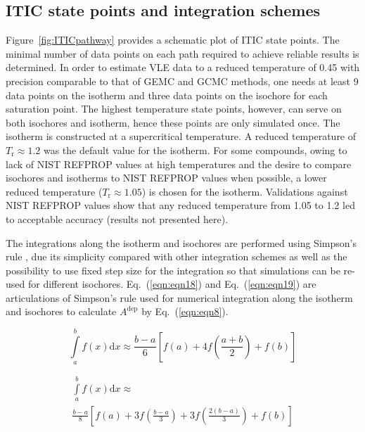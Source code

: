 \documentclass[5p,times]{elsarticle}
\begin{document}
\subsection{ITIC state points and integration schemes}\label{sec:ITIC-state-points}
Figure~\ref{fig:ITICpathway} provides a schematic plot of ITIC state points. The minimal number of data points on each path required to achieve reliable results is determined. 
In order to estimate VLE data to a reduced temperature of 0.45 with precision comparable to that of GEMC and GCMC methods, one needs at least 9 data points on the isotherm and three data points on the isochore for each saturation point.
The highest temperature state points, however, can serve on both isochores and isotherm, hence these points are only simulated once. The isotherm is constructed at a supercritical temperature. A reduced temperature of $T_\mathrm{r} \approx 1.2$ was the default value for the isotherm. For some compounds, owing to lack of NIST REFPROP values at high temperatures and the desire to compare isochores and isotherms to NIST REFPROP values when possible, a lower reduced temperature ($T_\mathrm{r} \approx 1.05$) is chosen for the isotherm. Validations against NIST REFPROP values show that any reduced temperature from 1.05 to 1.2 led to acceptable accuracy (results not presented here).


The integrations along the isotherm and isochores are performed using Simpson's rule \cite{atkinson2008}, due its simplicity compared with other integration schemes as well as the possibility to use fixed step size for the integration so that simulations can be re-used for different isochores. Eq.~(\ref{eqn:eqn18}) and Eq.~(\ref{eqn:eqn19}) are
articulations of Simpson's rule used for numerical integration along the isotherm and isochores to calculate $A^{\mathrm{dep}}$ by Eq.~(\ref{eqn:eqn8}).

\begin{equation}
\int\limits_a^b {f(x)\mathrm{d} x \approx \frac{{b - a}}{6}} \left[ {f(a) + 4f \left( \frac{{a + b}}{2} \right) + f(b)} \right] \label{eqn:eqn18}
\end{equation}

\begin{equation}
\begin{array}{l}
{\int\limits_a^b f(x)\mathrm{d}x \approx }
\\ 
{{\frac{{b - a}}{8} \left[ {f(a) + 3f \left( \frac{{b - a}}{3} \right) + 3f \left( \frac{{2(b - a)}}{3} \right) + f(b)} \right]}}  
\end{array}
\label{eqn:eqn19}
\end{equation}
\end{document}
